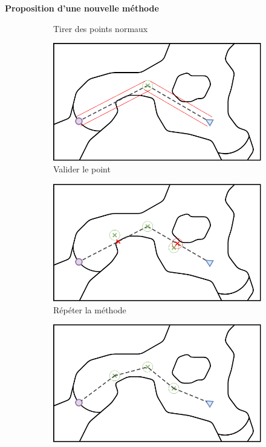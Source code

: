 \documentclass[aspectratio=169,10pt]{beamer}
\begin{document}
\begin{frame}{\textbf{Proposition d'une nouvelle méthode}}
\begin{figure}[H]
\begin{subfigure}[b]{0.3\textwidth}
			\caption{Tirer des points normaux}
			\label{fig:shoot_line}
		\end{subfigure}
		\vfill
		\begin{subfigure}[b]{0.3\textwidth}
			\centering
			\includegraphics[width=\textwidth]{IMAGES/methode4.png}
			\caption{Valider le point}
			\label{fig:validate_point}
		\end{subfigure}
		\hfill
		\begin{subfigure}[b]{0.3\textwidth}
			\centering
			\includegraphics[width=\textwidth]{IMAGES/methode5.png}
			\caption{Répéter la méthode}
			\label{fig:repeat_method}
		\end{subfigure}
		\hfill
		\begin{subfigure}[b]{0.3\textwidth}
			\centering
			\includegraphics[width=\textwidth]{IMAGES/methode6.png}

\end{subfigure}
\end{figure}
\end{frame}
\end{document}
